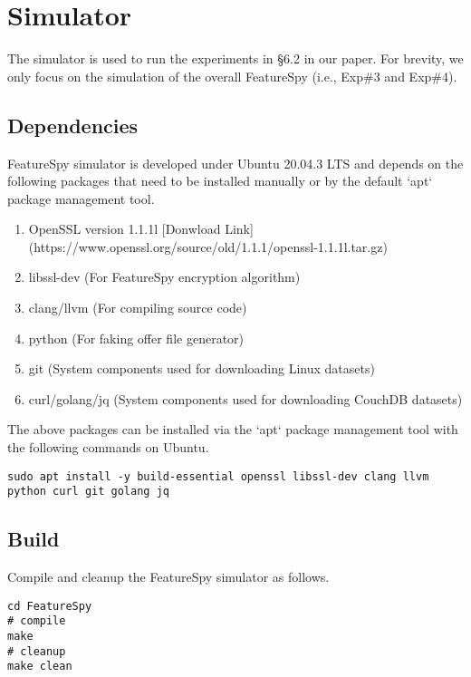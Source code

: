 \section{\sysnameF Simulator}

The simulator is used to run the experiments in §6.2 in our paper. For brevity, we only focus on the simulation of the overall FeatureSpy (i.e., Exp\#3 and Exp\#4).

\subsection{Dependencies}

FeatureSpy simulator is developed under Ubuntu 20.04.3 LTS and depends on the following packages that need to be installed manually or by the default `apt` package management tool.
\begin{enumerate}
    \item OpenSSL version 1.1.1l [Donwload Link](https://www.openssl.org/source/old/1.1.1/openssl-1.1.1l.tar.gz)
    \item libssl-dev (For FeatureSpy encryption algorithm)
    \item clang/llvm (For compiling source code)
    \item python (For faking offer file generator)
    \item git (System components used for downloading Linux datasets)
    \item curl/golang/jq (System components used for downloading CouchDB datasets)
\end{enumerate}


The above packages can be installed via the `apt` package management tool with the following commands on Ubuntu.

\begin{lstlisting}[style=shell]
sudo apt install -y build-essential openssl libssl-dev clang llvm python curl git golang jq
\end{lstlisting}

\subsection{Build}

Compile and cleanup the FeatureSpy simulator as follows.

\begin{lstlisting}[style=shell]
cd FeatureSpy
# compile
make
# cleanup
make clean
\end{lstlisting}

